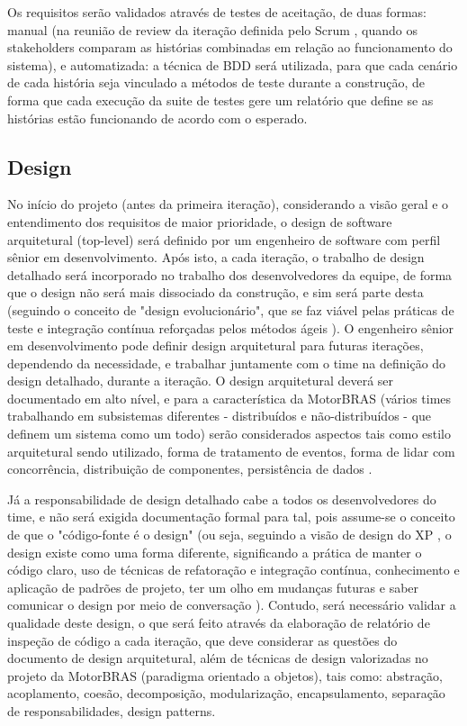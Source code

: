 \documentclass[12pt,journal,compsoc]{IEEEtran}
\begin{document}
Os requisitos serão validados através de testes de aceitação, de duas formas: manual (na reunião de review da iteração definida pelo Scrum \cite{scrum_development_process}, quando os stakeholders comparam as histórias combinadas em relação ao funcionamento do sistema), e automatizada: a técnica de BDD \cite{chelimsky2010rspec} será utilizada, para que cada cenário de cada história seja vinculado a métodos de teste durante a construção, de forma que cada execução da suite de testes gere um relatório que define se as histórias estão funcionando de acordo com o esperado.

\subsection{Design}

No início do projeto (antes da primeira iteração), considerando a visão geral e o entendimento dos requisitos de maior prioridade, o design de software arquitetural (top-level) \cite{society_software_2004} será definido por um %
engenheiro de software com perfil sênior em desenvolvimento. Após isto, a cada iteração, o trabalho de design detalhado será incorporado no trabalho dos desenvolvedores da equipe, de forma que o design não será mais dissociado da construção, e sim será parte desta (seguindo o conceito de "design evolucionário", que se faz viável pelas práticas de teste e integração contínua reforçadas pelos métodos ágeis \cite{fowler_planned_evolutionary_design}). O engenheiro sênior em desenvolvimento pode definir design arquitetural para futuras iterações, dependendo da necessidade, e trabalhar juntamente com o time na definição do design detalhado, durante a iteração. O design arquitetural deverá ser documentado em alto nível, e para a característica da MotorBRAS (vários times trabalhando em subsistemas diferentes - distribuídos e não-distribuídos - que definem um sistema como um todo) serão considerados aspectos tais como estilo arquitetural sendo utilizado, forma de tratamento de eventos, forma de lidar com concorrência, distribuição de componentes, persistência de dados \cite{society_software_2004}.

Já a responsabilidade de design detalhado cabe a todos os desenvolvedores do time, e não será exigida documentação formal para tal, pois assume-se o conceito de que o "código-fonte é o design" (ou seja, seguindo a visão de design do XP \cite{xp}, o design existe como uma forma diferente, significando a prática de manter o código claro, uso de técnicas de refatoração e integração contínua, conhecimento e aplicação de padrões de projeto, ter um olho em mudanças futuras e saber comunicar o design por meio de conversação \cite{fowler_design_dead}). Contudo, será necessário validar a qualidade deste design, o que será feito através da elaboração de relatório de inspeção de código a cada iteração, que deve considerar as questões do documento de design arquitetural, além de técnicas de design valorizadas no projeto da MotorBRAS (paradigma orientado a objetos), tais como: abstração, acoplamento, coesão, decomposição, modularização, encapsulamento, separação de responsabilidades, design patterns. 
\end{document}
